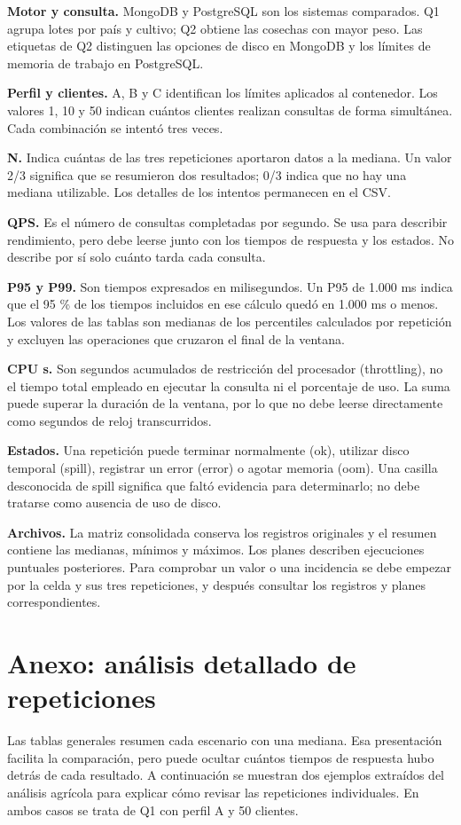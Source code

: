 \documentclass[12pt,letterpaper]{article}
\begin{document}
\textbf{Motor y consulta.} MongoDB y PostgreSQL son los sistemas comparados. Q1 agrupa lotes por país y cultivo; Q2 obtiene las cosechas con mayor peso. Las etiquetas de Q2 distinguen las opciones de disco en MongoDB y los límites de memoria de trabajo en PostgreSQL.

\textbf{Perfil y clientes.} A, B y C identifican los límites aplicados al contenedor. Los valores 1, 10 y 50 indican cuántos clientes realizan consultas de forma simultánea. Cada combinación se intentó tres veces.

\textbf{N.} Indica cuántas de las tres repeticiones aportaron datos a la mediana. Un valor 2/3 significa que se resumieron dos resultados; 0/3 indica que no hay una mediana utilizable. Los detalles de los intentos permanecen en el CSV.

\textbf{QPS.} Es el número de consultas completadas por segundo. Se usa para describir rendimiento, pero debe leerse junto con los tiempos de respuesta y los estados. No describe por sí solo cuánto tarda cada consulta.

\textbf{P95 y P99.} Son tiempos expresados en milisegundos. Un P95 de 1.000 ms indica que el 95 \% de los tiempos incluidos en ese cálculo quedó en 1.000 ms o menos. Los valores de las tablas son medianas de los percentiles calculados por repetición y excluyen las operaciones que cruzaron el final de la ventana.

\textbf{CPU s.} Son segundos acumulados de restricción del procesador (throttling), no el tiempo total empleado en ejecutar la consulta ni el porcentaje de uso. La suma puede superar la duración de la ventana, por lo que no debe leerse directamente como segundos de reloj transcurridos.

\textbf{Estados.} Una repetición puede terminar normalmente (ok), utilizar disco temporal (spill), registrar un error (error) o agotar memoria (oom). Una casilla desconocida de spill significa que faltó evidencia para determinarlo; no debe tratarse como ausencia de uso de disco.

\textbf{Archivos.} La matriz consolidada conserva los registros originales y el resumen contiene las medianas, mínimos y máximos. Los planes describen ejecuciones puntuales posteriores. Para comprobar un valor o una incidencia se debe empezar por la celda y sus tres repeticiones, y después consultar los registros y planes correspondientes.


\clearpage
\section*{Anexo: análisis detallado de repeticiones}
Las tablas generales resumen cada escenario con una mediana. Esa presentación facilita la comparación, pero puede ocultar cuántos tiempos de respuesta hubo detrás de cada resultado. A continuación se muestran dos ejemplos extraídos del análisis agrícola para explicar cómo revisar las repeticiones individuales. En ambos casos se trata de Q1 con perfil A y 50 clientes.
\end{document}
